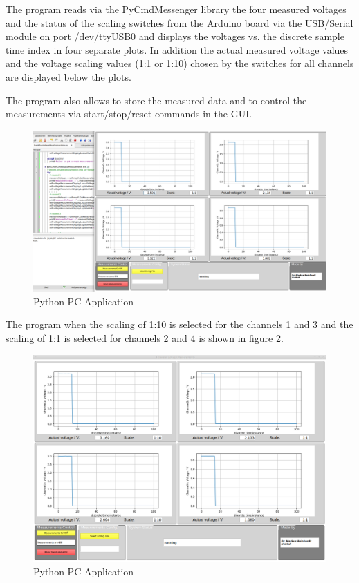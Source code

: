 \documentclass[11pt, oneside]{scrartcl}   	%
\begin{document}
The program reads via the PyCmdMessenger library the four measured voltages and the status of the scaling switches from the Arduino board
via the USB/Serial module on port /dev/ttyUSB0 and displays the voltages vs. the discrete sample time index in four separate plots.
In addition the actual measured voltage values and the voltage scaling values (1:1 or 1:10) chosen by the switches for all channels are displayed below the plots.

The program also allows to store the measured data and to control the measurements via start/stop/reset commands in the GUI.
\begin{figure}[htbp]
	\centering
	\includegraphics[width=1.0\linewidth]{Figures/ApplicationWindow.png}
	\caption[Python PC Application]{Python PC Application}
	\label{fig:ApplicationWindow}
\end{figure}


The program when the scaling of 1:10 is selected for the channels 1 and 3 and the scaling of 1:1 is selected for channels 2 and 4 is shown in figure \ref{fig:ApplicationWindow1}.
\begin{figure}[htbp]
	\centering
	\includegraphics[width=1.0\linewidth]{Figures/ApplicationWindow1.png}
	\caption[Python PC Application]{Python PC Application}
	\label{fig:ApplicationWindow1}
\end{figure}
\end{document}
